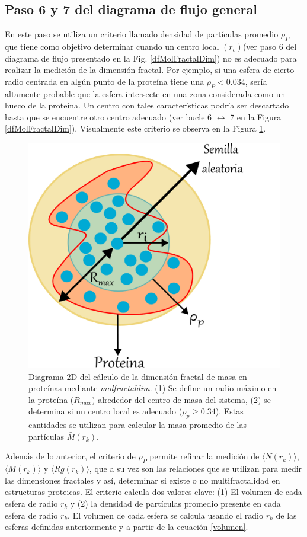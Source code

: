 	 
	 
	 \subsection{Paso 6 y 7 del diagrama de flujo general}
	 \label{sec:paso6}
	 
	 En este paso se utiliza un criterio llamado densidad de partículas promedio $\rho_{P}$ que tiene como objetivo determinar cuando un centro local $(r_c)$(ver paso 6 del diagrama de flujo presentado en la Fig. \ref{dfMolFractalDim}) no es adecuado para realizar la medici\'{o}n de la dimensi\'{o}n fractal. Por ejemplo, si una esfera de cierto radio centrada en alg\'{u}n punto de la proteína tiene una $\rho_{P} < 0.034$, ser\'{i}a altamente probable que la esfera intersecte en una zona considerada como un hueco de la prote\'{i}na. Un centro con tales caracter\'{i}sticas podr\'{i}a ser descartado hasta que se encuentre otro centro adecuado (ver bucle 6 $\longleftrightarrow$ 7 en la Figura \ref{dfMolFractalDim}). Visualmente este criterio se observa en la Figura \ref{fig:centrob}. 
	 
	 	\begin{figure}[H]
	 	\centering
	 	\includegraphics[width=0.5\linewidth]{graphs/centrob4.pdf}
	 	\caption{Diagrama 2D del c\'{a}lculo de la dimensi\'{o}n fractal de masa en prote\'{i}nas mediante \textit{molfractaldim}. (1) Se define un radio m\'{a}ximo en la prote\'{i}na ($R_{max}$) alrededor del centro de masa del sistema, (2) se determina si un centro local es adecuado ($\rho_{p} \geq 0.34$). Estas cantidades se utilizan para calcular la masa promedio de las part\'{i}culas $\bar{M}(r_k)$.}
	 	\label{fig:centrob}
	 \end{figure}
	 
	  Además de lo anterior, el criterio de \(\rho_{P}\) permite refinar la medici\'{o}n de $\langle N(r_k) \rangle$, $\langle M(r_k) \rangle$ y $\langle Rg(r_k) \rangle$, que a su vez son las relaciones que se utilizan para medir las dimensiones fractales y as\'{i}, determinar si existe o no multifractalidad en estructuras proteicas. El criterio calcula dos valores clave: (1) El volumen de cada esfera de radio $r_k$ y (2) la densidad de partículas promedio presente en cada esfera de radio $r_k$. El volumen de cada esfera se calcula usando el radio \(r_k\) de las esferas definidas anteriormente y a partir de la ecuaci\'{o}n \ref{volumen}.\\
	 
